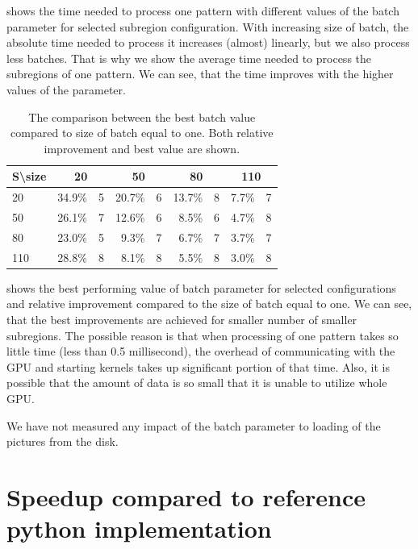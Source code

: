  shows the time needed to process one pattern with different values of the batch parameter for selected subregion configuration. With increasing size of batch, the absolute time needed to process it increases (almost) linearly, but we also process less batches. That is why we show the average time needed to process the subregions of one pattern. We can see, that the time improves with the higher values of the parameter.

\begin{table}[]
	\centering
	\begin{tabular}{@{}l|rrrrrrrr@{}}
		S\textbackslash size & \multicolumn{2}{c}{20} & \multicolumn{2}{c}{50} & \multicolumn{2}{c}{80} & \multicolumn{2}{c}{110} \\ \midrule
		20                   & 34.9\% &             5 & 20.7\% &             6 & 13.7\% &             8 & 7.7\% &               7 \\
		50                   & 26.1\% &             7 & 12.6\% &             6 &  8.5\% &             6 & 4.7\% &               8 \\
		80                   & 23.0\% &             5 &  9.3\% &             7 &  6.7\% &             7 & 3.7\% &               7 \\
		110                  & 28.8\% &             8 &  8.1\% &             8 &  5.5\% &             8 & 3.0\% &               8
	\end{tabular}
	\caption{The comparison between the best batch value compared to size of batch equal to one. Both relative improvement and best value are shown.}
	\label{batch-table}
\end{table}

 shows the best performing value of batch parameter for selected configurations and relative improvement compared to the size of batch equal to one. We can see, that the best improvements are achieved for smaller number of smaller subregions. The possible reason is that when processing of one pattern takes so little time (less than 0.5 millisecond), the overhead of communicating with the GPU and starting kernels takes up significant portion of that time. Also, it is possible that the amount of data is so small that it is unable to utilize whole GPU.

We have not measured any impact of the batch parameter to loading of the pictures from the disk.

\section{Speedup compared to reference python implementation}

